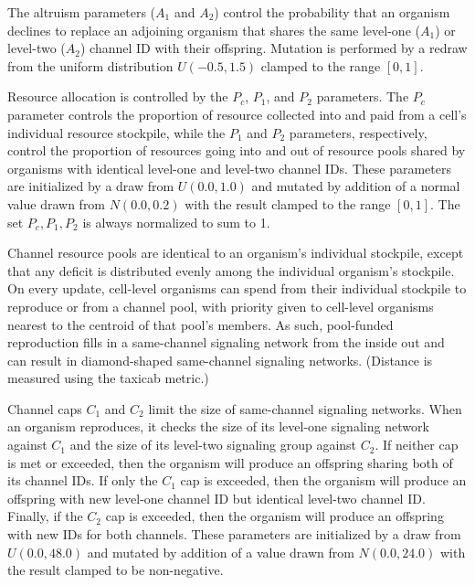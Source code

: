 The altruism parameters ($A_1$ and $A_2$) control the probability that an organism declines to replace an adjoining organism that shares the same level-one ($A_1$) or level-two ($A_2$) channel ID with their offspring.
Mutation is performed by a redraw from the uniform distribution $U(-0.5,1.5)$ clamped to the range $[0,1]$.

Resource allocation is controlled by the $P_{c}$, $P_1$, and $P_2$ parameters.
The $P_{c}$ parameter controls the proportion of resource collected into and paid from a cell's individual resource stockpile, while the $P_1$ and $P_2$ parameters, respectively, control the proportion of resources going into and out of resource pools shared by organisms with identical level-one and level-two channel IDs.
These parameters are initialized by a draw from $U(0.0, 1.0)$ and mutated by addition of a normal value drawn from $N(0.0,0.2)$ with the result clamped to the range $[0,1]$.
The set $P_{c}, P_1, P_2$ is always normalized to sum to 1.

Channel resource pools are identical to an organism's individual stockpile, except that any deficit is distributed evenly among the individual organism's stockpile.
On every update, cell-level organisms can spend from their individual stockpile to reproduce or from a channel pool, with priority given to cell-level organisms nearest to the centroid of that pool's members.
As such, pool-funded reproduction fills in a same-channel signaling network from the inside out and can result in diamond-shaped same-channel signaling networks.
(Distance is measured using the taxicab metric.)

Channel caps $C_1$ and $C_2$ limit the size of same-channel signaling networks.
When an organism reproduces, it checks the size of its level-one signaling network against $C_1$ and the size of its level-two signaling group against $C_2$.
If neither cap is met or exceeded, then the organism will produce an offspring sharing both of its channel IDs.
If only the $C_1$ cap is exceeded, then the organism will produce an offspring with new level-one channel ID but identical level-two channel ID.
Finally, if the $C_2$ cap is exceeded, then the organism will produce an offspring with new IDs for both channels.
These parameters are initialized by a draw from $U(0.0, 48.0)$ and mutated by addition of a value drawn from $N(0.0,24.0)$ with the result clamped to be non-negative.

